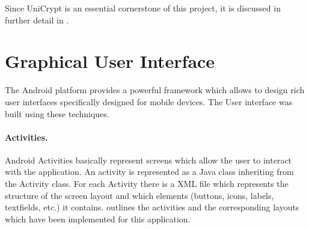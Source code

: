 \documentclass[numbers=noenddot, abstract=on, a4paper, headsepline,
footsepline, oneside, draft=off]{scrreprt}
\begin{document}
Since UniCrypt is an essential cornerstone of this project, it is discussed in
further detail in .

\section{Graphical User Interface}
\label{sec:graphicaluserinterface}

The Android platform provides a powerful framework which allows to design rich
user interfaces specifically designed for mobile devices. The User interface was
built using these techniques.

\paragraph{Activities.}
Android Activities basically represent screens which allow the user to interact
with the application. An activity is represented as a Java class inheriting from
the Activity class. For each Activity there is a XML file which represents the
structure of the screen layout and which elements (buttons, icons, labels,
textfields, etc.) it contains.  outlines the activities and
the corresponding layouts which have been implemented for this application.
\end{document}
